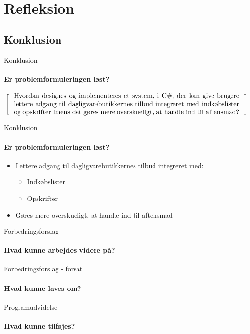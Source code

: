 \section{Refleksion}

\subsection{Konklusion}
\begin{frame}{Konklusion}
  \framesubtitle{Er problemformuleringen løst?}
  \[
  \left[
  \begin{minipage}{\textwidth}
  \centering
  \begin{minipage}{0.96\textwidth}
  Hvordan designes og implementeres et system, i C\#, der kan give brugere lettere adgang til dagligvarebutikkernes tilbud integreret med indkøbslister og opskrifter imens det gøres mere overskueligt, at handle ind til aftensmad?
  \end{minipage} 
  \end{minipage}                           
    \right]
\]
\end{frame}


\begin{frame}{Konklusion}
  \framesubtitle{Er problemformuleringen løst?}

  \begin{itemize}
    \item<2-4,6> Lettere adgang til dagligvarebutikkernes tilbud integreret med:
      \begin{itemize}
        \item <3,6>Indkøbslister
        \item <4,6>Opskrifter
      \end{itemize}
    \item <5,6>Gøres mere overskueligt, at handle ind til aftensmad
  \end{itemize}

\end{frame}

\begin{frame}{Forbedringsforslag}
  \framesubtitle{Hvad kunne arbejdes videre på?}
\end{frame}

\begin{frame}{Forbedringsforslag - forsat}
  \framesubtitle{Hvad kunne laves om?}
\end{frame}

\begin{frame}{Programudvidelse}
  \framesubtitle{Hvad kunne tilføjes?}
\end{frame}